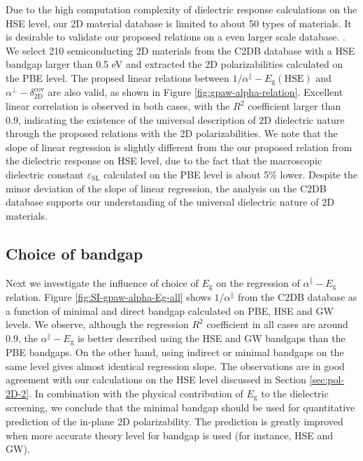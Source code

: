 \documentclass[manuscript=suppinfo,email=true,hyperref=true,keywords=false]{achemso}
\begin{document}
Due to the high computation complexity of dielectric response
calculations on the HSE level, our 2D material database is limited to
about 50 types of materials. It is desirable to validate our proposed
relations on a even larger scale database. . We select 210 semiconducting 2D materials from the
C2DB database with a HSE bandgap larger than 0.5 eV and extracted the
2D polarizabilities calculated on the PBE level. The propsed linear
relations between $1/\alpha^{\parallel}-E_{\mathrm{g}}(\mathrm{HSE})$
and $\alpha^{\perp}-\delta_{\mathrm{2D}}^{\mathrm{cov}}$ are also
valid, as shown in Figure \ref{fig:gpaw-alpha-relation}. Excellent
linear correlation is observed in both cases, with the $R^{2}$
coefficient larger than 0.9, indicating the existence of the universal
description of 2D dielectric nature through the proposed relations
with the 2D polarizabilities. We note that the slope of linear
regression is slightly different from the our proposed relation from
the dielectric response on HSE level, due to the fact that the
macroscopic dielectric constant $\varepsilon_{\mathrm{SL}}$ calculated
on the PBE level is about 5\% lower. Despite the minor deviation of
the slope of linear regression, the analysis on the C2DB database
supports our understanding of the universal dielectric nature of 2D
materials.

\subsection{Choice of bandgap}
\label{sec:gpaw-2}

Next we investigate the influence of choice of $E_{\mathrm{g}}$ on the
regression of $\alpha^{\parallel}-E_{\mathrm{g}}$ relation. Figure
\ref{fig:SI-gpaw-alpha-Eg-all} shows $1/\alpha^{\parallel}$ from the
C2DB database as a function of minimal and direct bandgap calculated
on PBE, HSE and GW levels. We observe,
although the regression $R^{2}$ coefficient in all cases are around
0.9, the $\alpha^{\parallel}-E_{\mathrm{g}}$ is better described using
the HSE and GW bandgaps than the PBE bandgaps. On the other hand,
using indirect or minimal bandgaps on the same level gives almost
identical regression slope. The observations are in good agreement
with our calculations on the HSE level discussed in Section
\ref{sec:pol-2D-2}. In combination with the physical contribution of
$E_{\mathrm{g}}$ to the dielectric screening, we conclude that the
minimal bandgap should be used for quantitative prediction of the
in-plane 2D polarizability. The prediction is greatly improved when
more accurate theory level for bandgap is used (for instance, HSE and GW).
\end{document}
